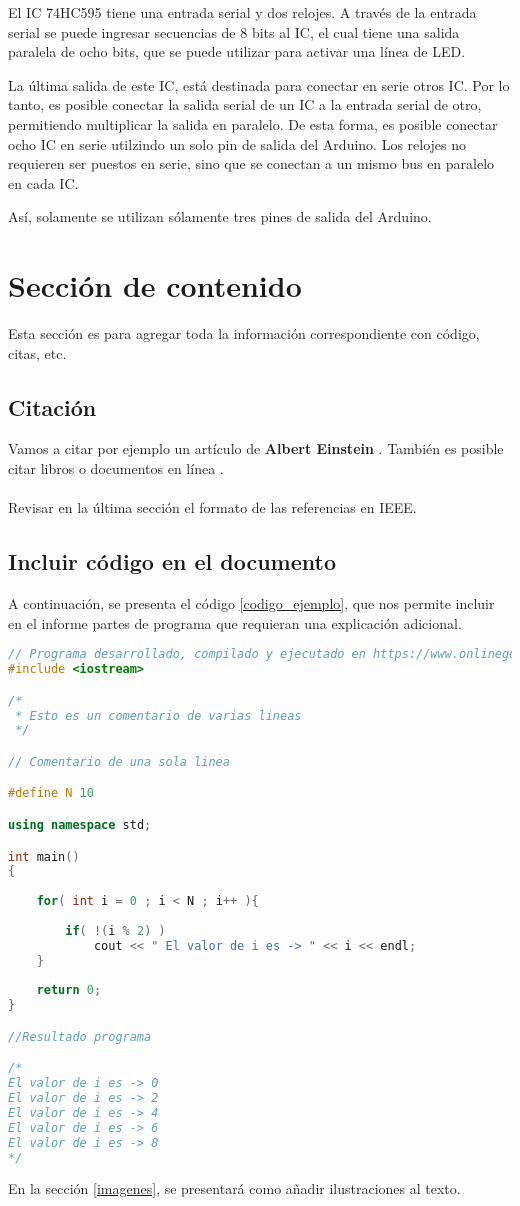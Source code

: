 \documentclass{article}
\begin{document}
El IC 74HC595 tiene una entrada serial y dos relojes. A través de la entrada serial se puede ingresar secuencias de 8 bits al IC, el cual  tiene una salida paralela de ocho bits, que se puede utilizar para activar una línea de LED.

La última salida de este IC, está destinada para conectar en serie otros IC. Por lo tanto, es posible conectar la salida serial de un IC a la entrada serial de otro, permitiendo multiplicar la salida en paralelo. De esta forma, es posible conectar ocho IC en serie utilzindo un solo pin de salida del Arduino. 
Los relojes no requieren ser puestos en serie, sino que se conectan a un mismo bus en paralelo en cada IC. 

Así, solamente se utilizan sólamente tres pines de salida del Arduino.



\section{Sección de contenido} \label{contenido}
Esta sección es para agregar toda la información correspondiente con código, citas, etc.
\subsection{Citación}
Vamos a citar por ejemplo un artículo de \textbf{Albert Einstein} \cite{einstein}.
También es posible citar libros \cite{dirac} o documentos en línea \cite{knuthwebsite}.\\\\
Revisar en la última sección el formato de las referencias en IEEE.

\subsection{Incluir código en el documento}
%
A continuación, se presenta el código \ref{codigo_ejemplo}, que nos permite incluir en el informe partes de programa que requieran una explicación adicional.
\begin{lstlisting}[language=C++, label=codigo_ejemplo]
// Programa desarrollado, compilado y ejecutado en https://www.onlinegdb.com
#include <iostream>

/*
 * Esto es un comentario de varias lineas
 */

// Comentario de una sola linea

#define N 10

using namespace std;

int main()
{
    
    for( int i = 0 ; i < N ; i++ ){
        
        if( !(i % 2) )
            cout << " El valor de i es -> " << i << endl;
    }
    
    return 0;
}

//Resultado programa

/*
El valor de i es -> 0
El valor de i es -> 2
El valor de i es -> 4
El valor de i es -> 6
El valor de i es -> 8
*/
\end{lstlisting}
En la sección \ref{imagenes}, se presentará como añadir ilustraciones al texto.
\end{document}
